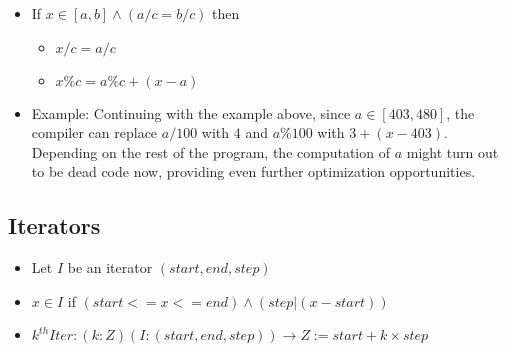\begin{enumerate}
  \begin{itemize}
  \tightlist
  \item
    If \(x \in [a, b] \wedge (a/c = b/c)\) then

    \begin{itemize}
    \tightlist
    \item
      \(x / c = a/c\)
    \item
      \(x \% c = a \% c + (x - a)\)
    \end{itemize}
  \item
    Example: Continuing with the example above, since
    \(a \in [403, 480]\), the compiler can replace \(a/100\) with \(4\)
    and \(a \% 100\) with \(3 + (x - 403)\). Depending on the rest of
    the program, the computation of \(a\) might turn out to be dead code
    now, providing even further optimization opportunities.
  \end{itemize}
\end{enumerate}

\hypertarget{iterators}{%
\subsection{Iterators}\label{iterators}}

\begin{itemize}
\tightlist
\item
  Let \(I\) be an iterator \((start, end, step)\)
\item
  \(x \in I\) if \((start <= x <= end) \wedge (step | (x - start))\)
\item
  \(k^{th}Iter : (k : Z) (I : (start, end, step)) \to Z := start + k\times step\)
\end{itemize}

